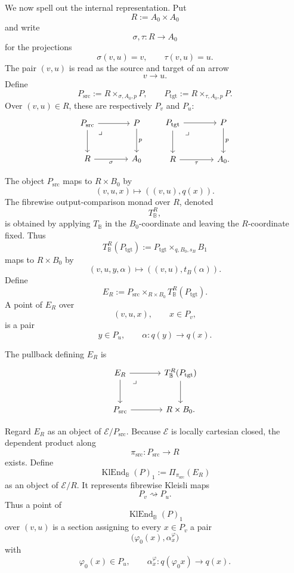 We now spell out the internal representation. Put
\[
    R:=A_0\times A_0
\]
and write
\[
    \sigma,\tau:R\to A_0
\]
for the projections
\[
    \sigma(v,u)=v,
    \qquad
    \tau(v,u)=u.
\]
The pair \((v,u)\) is read as the source and target of an arrow
\[
    v\to u.
\]
Define
\[
    P_{\mathrm{src}}
    :=
    R\times_{\sigma,A_0,p}P,
    \qquad
    P_{\mathrm{tgt}}
    :=
    R\times_{\tau,A_0,p}P.
\]
Over \((v,u)\in R\), these are respectively \(P_v\) and \(P_u\):
\[
\begin{tikzcd}[column sep=large, row sep=large]
    P_{\mathrm{src}}
        \arrow[r]
        \arrow[d]
        \arrow[dr, phantom, "\lrcorner", very near start]
    &
    P
        \arrow[d, "p"]
    \\
    R
        \arrow[r, "\sigma"']
    &
    A_0
\end{tikzcd}
\qquad
\begin{tikzcd}[column sep=large, row sep=large]
    P_{\mathrm{tgt}}
        \arrow[r]
        \arrow[d]
        \arrow[dr, phantom, "\lrcorner", very near start]
    &
    P
        \arrow[d, "p"]
    \\
    R
        \arrow[r, "\tau"']
    &
    A_0 .
\end{tikzcd}
\]

The object \(P_{\mathrm{src}}\) maps to \(R\times B_0\) by
\[
    (v,u,x)\longmapsto ((v,u),q(x)).
\]
The fibrewise output-comparison monad over \(R\), denoted
\[
    T^R_{\mathbb B},
\]
is obtained by applying \(T_{\mathbb B}\) in the \(B_0\)-coordinate and leaving
the \(R\)-coordinate fixed. Thus
\[
    T^R_{\mathbb B}(P_{\mathrm{tgt}})
    :=
    P_{\mathrm{tgt}}
    \times_{q,B_0,s_B}
    B_1
\]
maps to \(R\times B_0\) by
\[
    (v,u,y,\alpha)\longmapsto ((v,u),t_B(\alpha)).
\]
Define
\[
    E_R
    :=
    P_{\mathrm{src}}
    \times_{R\times B_0}
    T^R_{\mathbb B}(P_{\mathrm{tgt}}).
\]
A point of \(E_R\) over
\[
    (v,u,x),
    \qquad
    x\in P_v,
\]
is a pair
\[
    y\in P_u,
    \qquad
    \alpha:q(y)\to q(x).
\]

The pullback defining \(E_R\) is
\[
\begin{tikzcd}[column sep=large, row sep=large]
    E_R
        \arrow[r]
        \arrow[d]
        \arrow[dr, phantom, "\lrcorner", very near start]
    &
    T^R_{\mathbb B}(P_{\mathrm{tgt}})
        \arrow[d]
    \\
    P_{\mathrm{src}}
        \arrow[r]
    &
    R\times B_0 .
\end{tikzcd}
\]

Regard \(E_R\) as an object of \(\mathcal E/P_{\mathrm{src}}\). Because
\(\mathcal E\) is locally cartesian closed, the dependent product along
\[
    \pi_{\mathrm{src}}:P_{\mathrm{src}}\to R
\]
exists. Define
\[
    \operatorname{KlEnd}_{\mathbb B}(P)_1
    :=
    \Pi_{\pi_{\mathrm{src}}}(E_R)
\]
as an object of \(\mathcal E/R\). It represents fibrewise Kleisli maps
\[
    P_v\rightsquigarrow P_u.
\]
Thus a point of
\[
    \operatorname{KlEnd}_{\mathbb B}(P)_1
\]
over \((v,u)\) is a section assigning to every \(x\in P_v\) a pair
\[
    \bigl(\varphi_0(x),\alpha^\varphi_x\bigr)
\]
with
\[
    \varphi_0(x)\in P_u,
    \qquad
    \alpha^\varphi_x:q(\varphi_0x)\to q(x).
\]

